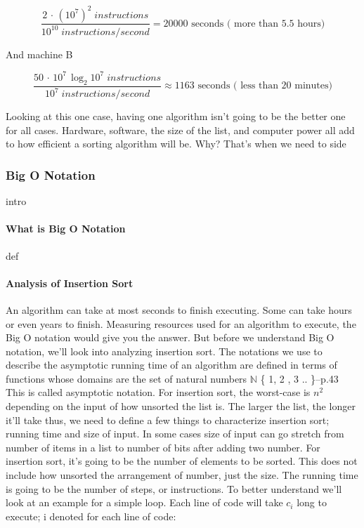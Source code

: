 \documentclass[12pt]{article}
\begin{document}
	$$\frac{2\,\cdot\,(10^7)^2 \;instructions}{10^{10} \;instructions/\!second}=20000\mbox{ seconds ( more than 5.5 hours)}$$
	
	And machine B
	
	$$\frac{50\,\cdot\,10^7\,\log_2{10^7}\;instructions}{10^{7} \;instructions/\!second}\approx1163\mbox{ seconds ( less than 20 minutes)}$$
	                                                                                 
	Looking at this one case, having one algorithm isn't going to be the better one for all cases. Hardware, software, the size of the list, and computer power all add to how efficient a sorting algorithm will be. Why? That's when we need to side 
	                                                                                 
	\subsubsection{Big O Notation}
	
	intro
	
	\paragraph{What is Big O Notation}
	
	def 
	
	\paragraph{Analysis of Insertion Sort}
	
	An algorithm can take at most seconds to finish executing.
	Some can take hours or even years to finish.
	Measuring resources used for an algorithm to execute, the Big O notation would give you the answer.
	But before we understand Big O notation, we’ll look into analyzing insertion sort.
	The notations we use to describe the asymptotic running time of an algorithm are defined in terms of functions whose domains are the set of natural numbers $\mathbb{N}$ \{ 1, 2 , 3 .. \}–p.43
	This is called asymptotic notation.
	For insertion sort, the worst-case is $n^2$ depending on the input of how unsorted the list is.
	The larger the list, the longer it’ll take thus, we need to define a few things to characterize insertion sort; running time and size of input.
	In some cases size of input can go stretch from number of items in a list to number of bits after adding two number. 
	For insertion sort, it’s going to be the number of elements to be sorted.
	This does not include how unsorted the arrangement of number, just the size.
	The running time is going to be the number of steps, or instructions.
	To better understand we’ll look at an example for a simple loop.
	Each line of code will take $c_i$ long to execute; i denoted for each line of code:
	
\end{document}
